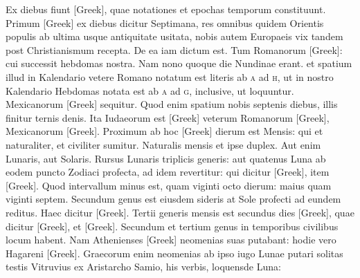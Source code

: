 Ex diebus fiunt \textgreek{[Greek]}, quae notationes et epochas
temporum constituunt.
Primum \textgreek{[Greek]} ex diebus dicitur Septimana,
res omnibus quidem Orientis populis ab ultima usque
antiquitate usitata,
 nobis autem Europaeis vix tandem post Christianismum
recepta.
De ea iam dictum est.
Tum Romanorum \textgreek{[Greek]}: cui
successit hebdomas nostra.
Nam nono quoque die Nundinae erant.
et spatium illud in Kalendario vetere Romano notatum est literis ab
\textsc{a} ad \textsc{h}, ut in nostro Kalendario Hebdomas
 notata est ab \textsc{a} ad \textsc{g}, inclusive,
ut loquuntur.
Mexicanorum \textgreek{[Greek]} sequitur.
Quod
enim spatium nobis septenis diebus, illis finitur ternis denis.
Ita Iudaeorum
est \textgreek{[Greek]} veterum Romanorum \textgreek{[Greek]},
 Mexicanorum
\textgreek{[Greek]}.
Proximum ab hoc \textgreek{[Greek]} dierum est Mensis:
qui et naturaliter, et civiliter sumitur.
Naturalis mensis et ipse duplex.
Aut enim Lunaris, aut Solaris.
Rursus Lunaris triplicis generis:
aut quatenus Luna ab eodem puncto Zodiaci profecta, ad idem
revertitur: qui dicitur \textgreek{[Greek]},
 item \textgreek{[Greek]}.
Quod intervallum
minus est, quam viginti octo dierum: maius quam viginti septem.
Secundum genus est eiusdem sideris at Sole profecti ad eundem
reditus.
Haec dicitur \textgreek{[Greek]}.
Tertii generis mensis est secundus
dies \textgreek{[Greek]}, quae dicitur \textgreek{[Greek]},
 et \textgreek{[Greek]}.
Secundum et tertium genus in temporibus civilibus locum habent.
Nam Athenienses \textgreek{[Greek]} neomenias suas putabant:
 hodie vero
Hagareni \textgreek{[Greek]}.
Graecorum enim neomenias ab ipso iugo
Lunae putari solitas testis Vitruvius ex Aristarcho Samio, his verbis,
loquensde Luna:

